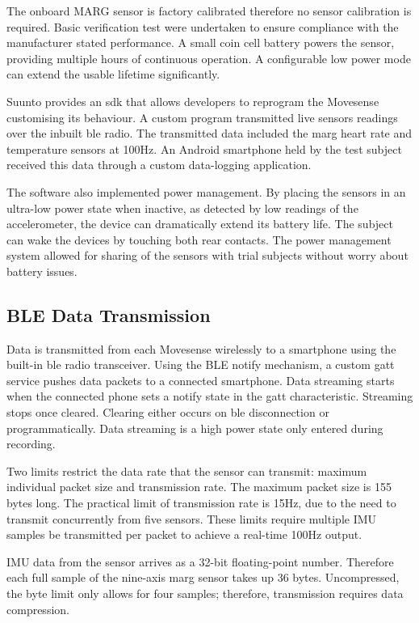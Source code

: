 The onboard MARG sensor is factory calibrated therefore no sensor calibration is required. Basic verification test were undertaken to ensure compliance with the manufacturer stated performance. A small coin cell battery powers the sensor, providing multiple hours of continuous operation. A configurable low power mode can extend the usable lifetime significantly.

Suunto provides an \acrfull{sdk} that allows developers to reprogram the Movesense customising its behaviour. A custom program transmitted live sensors readings over the inbuilt \acrshort{ble} radio. The transmitted data included the \acrshort{marg} heart rate and temperature sensors at 100Hz. An Android smartphone held by the test subject received this data through a custom data-logging application.

The software also implemented power management. By placing the sensors in an ultra-low power state when inactive, as detected by low readings of the accelerometer, the device can dramatically extend its battery life. The subject can wake the devices by touching both rear contacts. The power management system allowed for sharing of the sensors with trial subjects without worry about battery issues.

\subsection{BLE Data Transmission} %
\label{subsection:methods-on-sensor-compression}
Data is transmitted from each Movesense wirelessly to a smartphone using the built-in \acrshort{ble} radio transceiver. Using the BLE notify mechanism, a custom \acrfull{gatt} service pushes data packets to a connected smartphone. Data streaming starts when the connected phone sets a notify state in the \acrshort{gatt} characteristic. Streaming stops once cleared. Clearing either occurs on \acrshort{ble} disconnection or programmatically. Data streaming is a high power state only entered during recording.

Two limits restrict the data rate that the sensor can transmit: maximum individual packet size and transmission rate. The maximum packet size is 155 bytes long. The practical limit of transmission rate is 15Hz, due to the need to transmit concurrently from five sensors. These limits require multiple IMU samples be transmitted per packet to achieve a real-time 100Hz output.

IMU data from the sensor arrives as a 32-bit floating-point number. Therefore each full sample of the nine-axis \acrshort{marg} sensor takes up 36 bytes. Uncompressed, the byte limit only allows for four samples; therefore, transmission requires data compression.


